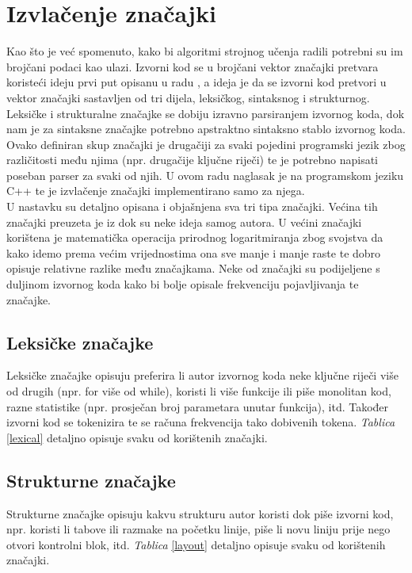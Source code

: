 \section{Izvlačenje značajki} \label{sec:fe}
Kao što je već spomenuto, kako bi algoritmi strojnog učenja radili potrebni su im brojčani podaci kao ulazi. Izvorni kod se u brojčani vektor značajki pretvara koristeći ideju prvi put opisanu u radu \cite{islam}, a ideja je da se izvorni kod pretvori u vektor značajki sastavljen od tri dijela, leksičkog, sintaksnog i strukturnog. Leksičke i strukturalne značajke se dobiju izravno parsiranjem izvornog koda, dok nam je za sintaksne značajke potrebno apstraktno sintaksno stablo izvornog koda. Ovako definiran skup značajki je drugačiji za svaki pojedini programski jezik zbog različitosti među njima (npr. drugačije ključne riječi) te je potrebno napisati poseban parser za svaki od njih. U ovom radu naglasak je na programskom jeziku C++ te je izvlačenje značajki implementirano samo za njega. \\

	U nastavku su detaljno opisana i objašnjena sva tri tipa značajki. Većina tih značajki preuzeta je iz \cite{islam} dok su neke ideja samog autora. U većini značajki korištena je matematička operacija prirodnog logaritmiranja zbog svojstva da kako idemo prema većim vrijednostima ona sve manje i manje raste te dobro opisuje relativne razlike među značajkama. Neke od značajki su podijeljene s duljinom izvornog koda kako bi bolje opisale frekvenciju pojavljivanja te značajke. 

\subsection{Leksičke značajke}
Leksičke značajke opisuju preferira li autor izvornog koda neke ključne riječi više od drugih (npr. for više od while), koristi li više funkcije ili piše monolitan kod, razne statistike (npr. prosječan broj parametara unutar funkcija), itd. Također izvorni kod se tokenizira te se računa frekvencija tako dobivenih tokena. \textit{Tablica} \ref{lexical} detaljno opisuje svaku od korištenih značajki. 

\subsection{Strukturne značajke}
Strukturne značajke opisuju kakvu strukturu autor koristi dok piše izvorni kod, npr. koristi li tabove ili razmake na početku linije, piše li novu liniju prije nego otvori kontrolni blok, itd. \textit{Tablica} \ref{layout} detaljno opisuje svaku od korištenih značajki.

